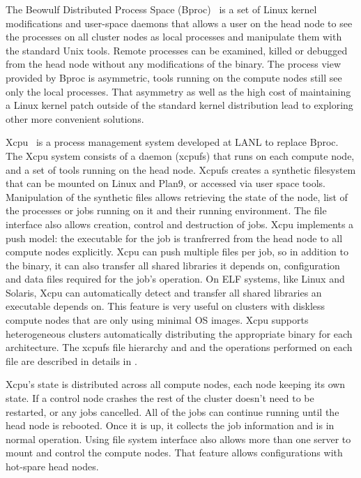 \documentclass[10pt,conference,letterpaper]{IEEEtran}
\begin{document}
The Beowulf Distributed Process Space (Bproc)~\cite{bproc} is a set of
Linux kernel modifications and user-space daemons that allows a user on the head
node to see the processes on all cluster nodes as local processes and
manipulate them with the standard Unix tools. Remote processes can be
examined, killed or debugged from the head node without any modifications of
the binary. The process view provided by Bproc is asymmetric, tools running
on the compute nodes still see only the local processes. That asymmetry as
well as the high cost of maintaining a Linux kernel patch outside of the
standard kernel distribution lead to exploring other more convenient solutions.

Xcpu~\cite{ron-xcpu} is a process management system developed at LANL to
replace Bproc. The Xcpu system consists of a daemon (xcpufs) that runs on
each compute node, and a set of tools running on the head node. Xcpufs
creates a synthetic filesystem that can be mounted on Linux and Plan9, or
accessed via user space tools. Manipulation of the synthetic files allows
retrieving the state of the node, list of the processes or jobs running on
it and their running environment. The file interface also allows creation,
control and destruction of jobs. Xcpu implements a push model: the
executable for the job is tranfrerred from the head node to all compute
nodes explicitly. Xcpu can push multiple files per job, so in addition to
the binary, it can also transfer all shared libraries it depends on,
configuration and data files required for the job's operation. On ELF
systems, like Linux and Solaris, Xcpu can automatically detect and transfer
all shared libraries an executable depends on. This feature is very useful
on clusters with diskless compute nodes that are only using minimal OS
images. Xcpu supports heterogeneous clusters automatically distributing the
appropriate binary for each architecture. The xcpufs file hierarchy and and
the operations performed on each file are described in details in
\cite{lucho-xcpu}.

Xcpu's state is distributed across all compute nodes, each node keeping its
own state. If a control node crashes the rest of the cluster doesn't need to
be restarted, or any jobs cancelled. All of the jobs can continue running
until the head node is rebooted. Once it is up, it collects the job
information and is in normal operation. Using file system interface also
allows more than one server to mount and control the compute nodes. That
feature allows configurations with hot-spare head nodes.
\end{document}
